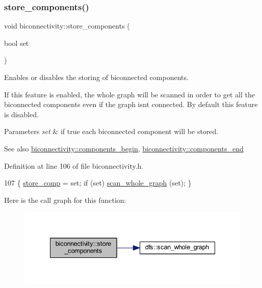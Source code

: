 \subsubsection{\texorpdfstring{store\+\_\+components()}{store\_components()}\hspace{0.1cm}{\footnotesize\ttfamily [2/2]}}
{\footnotesize\ttfamily void biconnectivity\+::store\+\_\+components (\begin{DoxyParamCaption}\item[{bool}]{set }\end{DoxyParamCaption})\hspace{0.3cm}{\ttfamily [inline]}}



Enables or disables the storing of biconnected components. 

If this feature is enabled, the whole graph will be scanned in order to get all the biconnected components even if the graph isn\textquotesingle{}t connected. By default this feature is disabled.


\begin{DoxyParams}{Parameters}
{\em set} & if true each biconnected component will be stored. \\
\hline
\end{DoxyParams}
\begin{DoxySeeAlso}{See also}
\mbox{\hyperlink{classbiconnectivity_ac0b7253533edc3f1412f771cb35bf04a}{biconnectivity\+::components\+\_\+begin}}, \mbox{\hyperlink{classbiconnectivity_a0bd1c70975e664174e591efd64f8dc71}{biconnectivity\+::components\+\_\+end}} 
\end{DoxySeeAlso}


Definition at line 106 of file biconnectivity.\+h.


\begin{DoxyCode}
107     \{ \mbox{\hyperlink{classbiconnectivity_a989307b07f4a976649bd7551173bd564}{store\_comp}}  = \textcolor{keyword}{set}; \textcolor{keywordflow}{if} (\textcolor{keyword}{set}) \mbox{\hyperlink{classdfs_a025ed2d6101a7b9f72578a52b484ef50}{scan\_whole\_graph}} (\textcolor{keyword}{set}); \}
\end{DoxyCode}
Here is the call graph for this function\+:\nopagebreak
\begin{figure}[H]
\begin{center}
\leavevmode
\includegraphics[width=335pt]{classbiconnectivity_ab7c9e256a4d7a4ffea33b20f014e1f69_cgraph}
\end{center}
\end{figure}
\mbox{\label{classdfs_a6f54f1c4339eacc8961e795439d4593d}} 
